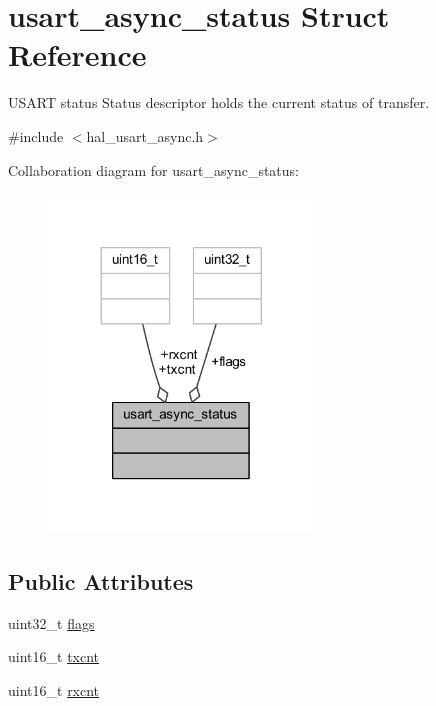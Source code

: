 \hypertarget{structusart__async__status}{}\section{usart\+\_\+async\+\_\+status Struct Reference}
\label{structusart__async__status}


U\+S\+A\+RT status Status descriptor holds the current status of transfer.  




{\ttfamily \#include $<$hal\+\_\+usart\+\_\+async.\+h$>$}



Collaboration diagram for usart\+\_\+async\+\_\+status\+:\nopagebreak
\begin{figure}[H]
\begin{center}
\leavevmode
\includegraphics[width=200pt]{structusart__async__status__coll__graph}
\end{center}
\end{figure}
\subsection*{Public Attributes}
\begin{DoxyCompactItemize}
\item 
uint32\+\_\+t \hyperlink{structusart__async__status_a6d85ac04ed76a86bb9c49bb45a848d9a}{flags}
\item 
uint16\+\_\+t \hyperlink{structusart__async__status_a5680433094528c4ff7bcd49fba77e970}{txcnt}
\item 
uint16\+\_\+t \hyperlink{structusart__async__status_ac32698399322fed11e6914cbd88f5ee5}{rxcnt}
\end{DoxyCompactItemize}


